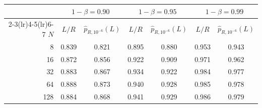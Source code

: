  \begin{tabular}{rcccccc}
    \toprule
     & \multicolumn{2}{c}{$1-\beta = 0.90$} & \multicolumn{2}{c}{$1-\beta = 0.95$} & \multicolumn{2}{c}{$1-\beta = 0.99$} \\
    \cmidrule(lr){2-3}\cmidrule(lr){4-5}\cmidrule(lr){6-7}
    $N$ & $L/R$ & $\widehat p_{R,10^{-6}}(L)$ & $L/R$ & $\widehat p_{R,10^{-6}}(L)$ & $L/R$ & $\widehat p_{R,10^{-6}}(L)$ \\
    \midrule
    8 & 0.839 & 0.821 & 0.895 & 0.880 & 0.953 & 0.943 \\
    16 & 0.872 & 0.856 & 0.922 & 0.909 & 0.971 & 0.962 \\
    32 & 0.883 & 0.867 & 0.934 & 0.922 & 0.984 & 0.977 \\
    64 & 0.888 & 0.873 & 0.940 & 0.928 & 0.985 & 0.978 \\
    128 & 0.884 & 0.868 & 0.941 & 0.929 & 0.986 & 0.979 \\
    \bottomrule
  \end{tabular}%
